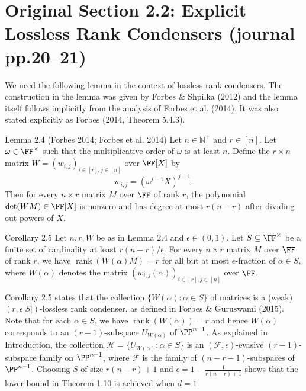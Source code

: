 \section*{Original Section 2.2: Explicit Lossless Rank Condensers (journal pp.20--21)}
We need the following lemma in the context of lossless rank condensers. The construction in the lemma was given by Forbes \& Shpilka (2012) and the lemma itself follows implicitly from the analysis of Forbes et al. (2014). It was also stated explicitly as Forbes (2014, Theorem 5.4.3).
\begin{result}{Lemma 2.4 (Forbes 2014; Forbes et al. 2014)}
Let $n\in\mathbb N^+$ and $r\in[n]$. Let $\omega\in\FF^\times$ such that the multiplicative order of $\omega$ is at least $n$. Define the $r\times n$ matrix $W=(w_{i,j})_{i\in[r],j\in[n]}$ over $\FF[X]$ by
\[w_{i,j}=(\omega^{i-1}X)^{j-1}.\]
Then for every $n\times r$ matrix $M$ over $\FF$ of rank $r$, the polynomial $\det(WM)\in\FF[X]$ is nonzero and has degree at most $r(n-r)$ after dividing out powers of $X$.
\end{result}
\begin{result}{Corollary 2.5}
Let $n,r,W$ be as in Lemma 2.4 and $\epsilon\in(0,1)$. Let $S\subseteq\FF^\times$ be a finite set of cardinality at least $r(n-r)/\epsilon$. For every $n\times r$ matrix $M$ over $\FF$ of rank $r$, we have $\operatorname{rank}(W(\alpha)M)=r$ for all but at most $\epsilon$-fraction of $\alpha\in S$, where $W(\alpha)$ denotes the matrix $(w_{i,j}(\alpha))_{i\in[r],j\in[n]}$ over $\FF$.
\end{result}
Corollary 2.5 states that the collection $\{W(\alpha):\alpha\in S\}$ of matrices is a (weak) $(r,\epsilon|S|)$-lossless rank condenser, as defined in Forbes \& Guruswami (2015). Note that for each $\alpha\in S$, we have $\operatorname{rank}(W(\alpha))=r$ and hence $W(\alpha)$ corresponds to an $(r-1)$-subspace $U_{W(\alpha)}$ of $\PP^{n-1}$. As explained in Introduction, the collection $\mathcal H=\{U_{W(\alpha)}:\alpha\in S\}$ is an $(\mathcal F,\epsilon)$-evasive $(r-1)$-subspace family on $\PP^{n-1}$, where $\mathcal F$ is the family of $(n-r-1)$-subspaces of $\PP^{n-1}$. Choosing $S$ of size $r(n-r)+1$ and $\epsilon=1-\frac1{r(n-r)+1}$ shows that the lower bound in Theorem 1.10 is achieved when $d=1$.
